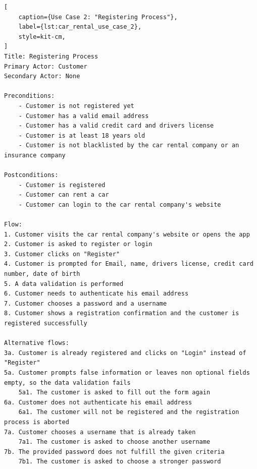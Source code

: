 \begin{lstlisting}[
    caption={Use Case 2: "Registering Process"},
    label={lst:car_rental_use_case_2},
    style=kit-cm,
]
Title: Registering Process
Primary Actor: Customer
Secondary Actor: None

Preconditions:
    - Customer is not registered yet
    - Customer has a valid email address
    - Customer has a valid credit card and drivers license
    - Customer is at least 18 years old
    - Customer is not blacklisted by the car rental company or an insurance company

Postconditions:
    - Customer is registered
    - Customer can rent a car
    - Customer can login to the car rental company's website

Flow:
1. Customer visits the car rental company's website or opens the app 
2. Customer is asked to register or login
3. Customer clicks on "Register"
4. Customer is prompted for Email, name, drivers license, credit card number, date of birth
5. A data validation is performed
6. Customer needs to authenticate his email address
7. Customer chooses a password and a username
8. Customer shows a registration confirmation and the customer is registered successfully 

Alternative flows:
3a. Customer is already registered and clicks on "Login" instead of "Register"
5a. Customer prompts false information or leaves non optional fields empty, so the data validation fails
    5a1. The customer is asked to fill out the form again
6a. Customer does not authenticate his email address
    6a1. The customer will not be registered and the registration process is aborted
7a. Customer chooses a username that is already taken
    7a1. The customer is asked to choose another username
7b. The provided password does not fulfill the given criteria
    7b1. The customer is asked to choose a stronger password
\end{lstlisting}

